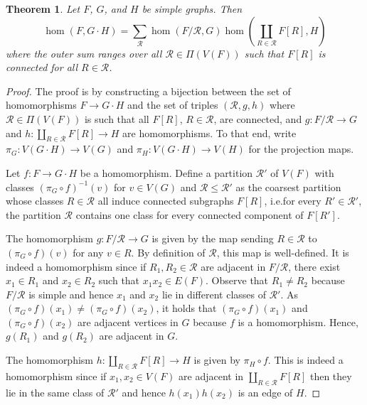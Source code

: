 \documentclass[3p,final]{elsarticle}
\newtheorem{theorem}{Theorem}
\begin{document}
	\begin{theorem} \label{thm:lexprod-hom}
		Let $F$, $G$, and $H$ be simple graphs. Then
		\[
			\hom(F, G \cdot H) = \sum_{\mathcal{R}}
			\hom(F/\mathcal{R}, G) \hom(\coprod_{R \in \mathcal{R}} F[R], H)
		\]
		where the outer sum ranges over all $\mathcal{R} \in \Pi(V(F))$ such that $F[R]$ is connected for all $R \in \mathcal{R}$.
	\end{theorem}
	\begin{proof}%
		The proof is by constructing a bijection between the set of homomorphisms $F \to G \cdot H$ and the set of triples $(\mathcal{R}, g, h)$ where $\mathcal{R} \in \Pi(V(F))$ is such that all $F[R]$, $R \in \mathcal{R}$, are connected, and $g \colon F/\mathcal{R} \to G$ and $h \colon \coprod_{R \in \mathcal{R}} F[R] \to H$ are homomorphisms.
		To that end, write $\pi_G \colon V(G \cdot H) \to V(G)$ and $\pi_H \colon V(G \cdot H) \to V(H)$ for the projection maps. 
		
		Let $f \colon F \to G \cdot H$ be a homomorphism. Define a partition $\mathcal{R}'$ of $V(F)$ with classes $(\pi_G \circ f)^{-1}(v)$ for $v \in V(G)$ and $\mathcal{R} \leq \mathcal{R}'$ as the coarsest partition whose classes $R \in \mathcal{R}$ all induce connected subgraphs $F[R]$, i.e.\@ for every $R' \in \mathcal{R}'$, the partition $\mathcal{R}$ contains one class for every connected component of $F[R']$.
		
		The homomorphism $g \colon F/\mathcal{R} \to G$ is given by the map sending $R \in \mathcal{R}$ to $(\pi_G \circ f)(v)$ for any $v \in R$. By definition of $\mathcal{R}$, this map is well-defined.
		It is indeed a homomorphism since if $R_1, R_2 \in \mathcal{R}$ are adjacent in $F/\mathcal{R}$,  there exist $x_1 \in R_1$ and $x_2 \in R_2$ such that $x_1x_2 \in E(F)$. 
		Observe that $R_1 \neq R_2$ because $F/\mathcal{R}$ is simple and hence $x_1$ and $x_2$ lie in different classes of $\mathcal{R}'$.
		As $(\pi_G \circ f)(x_1) \neq (\pi_G \circ f)(x_2)$, it holds that $(\pi_G \circ f)(x_1)$ and $(\pi_G \circ f)(x_2)$ are adjacent vertices in $G$ because $f$ is a homomorphism. Hence, $g(R_1)$ and $g(R_2)$ are adjacent in $G$.
		
		The homomorphism $h \colon \coprod_{R \in \mathcal{R}} F[R] \to H$ is given by $\pi_H \circ f$.
		This is indeed a homomorphism since if $x_1, x_2 \in V(F)$ are adjacent in $\coprod_{R \in \mathcal{R}} F[R]$ then they lie in the same class of $\mathcal{R}'$ and hence $h(x_1)h(x_2)$ is an edge of $H$.
		

\end{proof}
\end{document}
